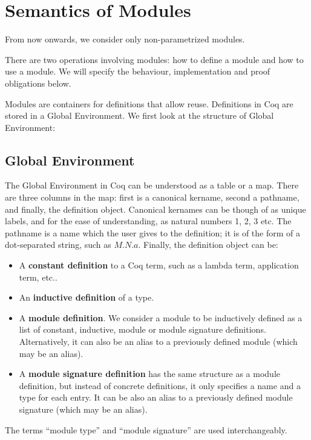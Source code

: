 \section{Semantics of Modules}
\label{sec:semantics-of-modules}
From now onwards, we consider only non-parametrized modules.

There are two operations involving modules: how to define a module and how to
use a module. We will specify the behaviour, implementation and proof
obligations below.

Modules are containers for definitions that allow reuse. Definitions in Coq are
stored in a Global Environment. We first look at the structure of Global Environment:

\subsection{Global Environment}
The Global Environment in Coq can be understood as a table or a map. There are
three columns in the map: first is a canonical kername, second a pathname, and
finally, the definition object. Canonical kernames can be though of as unique
labels, and for the ease of understanding, as natural numbers 1, 2, 3 etc.
The pathname is a name which the user gives to the definition; it is of the form
of a dot-separated string, such as $M.N.a$. Finally, the definition object can
be:
\begin{itemize}

\item A \textbf{constant definition} to a Coq term, such as a lambda term,
application term, etc..

\item An \textbf{inductive definition} of a type.

\item A \textbf{module definition}. We consider a module to be inductively
defined as a list of constant, inductive, module or module signature
definitions. Alternatively, it can also be an alias to a previously defined
module (which may be an alias).

\item A \textbf{module signature definition} has the same structure as a module
definition, but instead of concrete definitions, it only specifies a name and a
type for each entry. It can be also an alias to a previously defined module
signature (which may be an alias).

\end{itemize}
The terms ``module type'' and ``module signature'' are used interchangeably.

